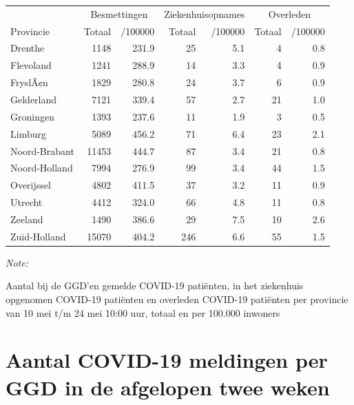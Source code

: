 \documentclass[
  english,
  man,floatsintext]{apa6}
\begin{document}
\begin{table}
\centering
\begin{threeparttable}
\begin{tabular}{lrrrrrr}
\toprule
\multicolumn{1}{c}{ } & \multicolumn{2}{c}{Besmettingen} & \multicolumn{2}{c}{Ziekenhuisopnames} & \multicolumn{2}{c}{Overleden} \\
\cmidrule(l{3pt}r{3pt}){2-3} \cmidrule(l{3pt}r{3pt}){4-5} \cmidrule(l{3pt}r{3pt}){6-7}
Provincie & Totaal & /100000 & Totaal & /100000 & Totaal & /100000\\
\midrule
Drenthe & 1148 & 231.9 & 25 & 5.1 & 4 & 0.8\\
Flevoland & 1241 & 288.9 & 14 & 3.3 & 4 & 0.9\\
FryslÃ¢n & 1829 & 280.8 & 24 & 3.7 & 6 & 0.9\\
Gelderland & 7121 & 339.4 & 57 & 2.7 & 21 & 1.0\\
Groningen & 1393 & 237.6 & 11 & 1.9 & 3 & 0.5\\
Limburg & 5089 & 456.2 & 71 & 6.4 & 23 & 2.1\\
Noord-Brabant & 11453 & 444.7 & 87 & 3.4 & 21 & 0.8\\
Noord-Holland & 7994 & 276.9 & 99 & 3.4 & 44 & 1.5\\
Overijssel & 4802 & 411.5 & 37 & 3.2 & 11 & 0.9\\
Utrecht & 4412 & 324.0 & 66 & 4.8 & 11 & 0.8\\
Zeeland & 1490 & 386.6 & 29 & 7.5 & 10 & 2.6\\
Zuid-Holland & 15070 & 404.2 & 246 & 6.6 & 55 & 1.5\\
\bottomrule
\end{tabular}
\begin{tablenotes}
\item \textit{Note: } 
\item Aantal bij de GGD’en gemelde COVID-19 patiënten, in het ziekenhuis opgenomen COVID-19 patiënten en overleden COVID-19 patiënten per provincie van 10 mei t/m 24 mei 10:00 uur, totaal en per 100.000 inwoners
\end{tablenotes}
\end{threeparttable}
\end{table}

\newpage

\hypertarget{aantal-covid-19-meldingen-per-ggd-in-de-afgelopen-twee-weken}{%
\section{Aantal COVID-19 meldingen per GGD in de afgelopen twee weken}\label{aantal-covid-19-meldingen-per-ggd-in-de-afgelopen-twee-weken}}
\end{document}
